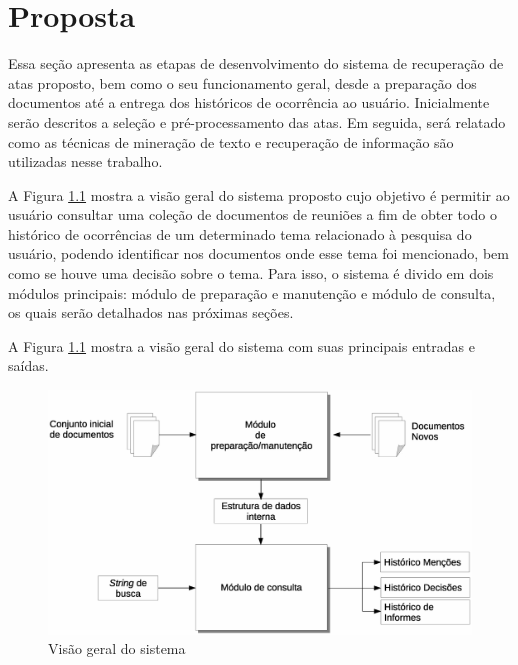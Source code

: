 \chapter{Proposta}\label{cap3}


Essa seção apresenta as etapas de desenvolvimento do sistema de recuperação de atas proposto, bem como o seu funcionamento geral, desde a preparação dos documentos até a entrega dos históricos de ocorrência ao usuário. Inicialmente serão descritos a seleção e pré-processamento das atas. Em seguida, será relatado como as técnicas de mineração de texto e recuperação de informação são utilizadas nesse trabalho.

A Figura \ref{fig:visao-geral} mostra a visão geral do sistema proposto cujo objetivo é permitir ao usuário consultar uma coleção de documentos de reuniões a fim de obter todo o histórico de ocorrências de um determinado tema relacionado à pesquisa do usuário, podendo identificar nos documentos onde esse tema foi mencionado, bem como se houve uma decisão sobre o tema. Para isso, o sistema é divido em dois módulos principais: módulo de preparação e manutenção e módulo de consulta, os quais serão detalhados nas próximas seções.  %

A Figura \ref{fig:visao-geral} mostra a visão geral do sistema com suas principais entradas e saídas. 


  \begin{figure}[!h]
	  \centering
	  \includegraphics[width=0.69\paperwidth]{conteudo/capitulos/figs/visao-geral-3.eps}
	  \caption{Visão geral do sistema}
	  \label{fig:visao-geral}
  \end{figure}






